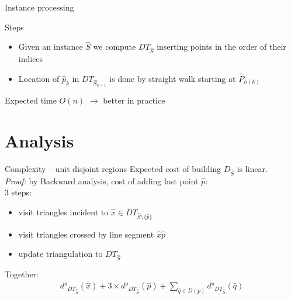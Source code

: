 \documentclass{beamer}
\begin{document}
\begin{frame}{Instance processing}
  \begin{block}{Steps}
    \begin{itemize}
     \item Given an instance $\hat{S}$ we compute $DT_{\hat{S}}$ inserting points in the order of their indices
     \item Location of $\hat{p}_k$ in $DT_{\hat{S}_{k-1}}$ is done by straight walk starting at $\hat{P}_{h(k)}$
    \end{itemize}
  \end{block}
  
  \begin{block}{Expected time}
    $O(n)$ $\rightarrow$ better in practice
  \end{block}
  
\end{frame}


\section{Analysis}
\frame{\tableofcontents[currentsection]}

\begin{frame}

\end{frame}

\begin{frame}{Complexity -- unit disjoint regions}
Expected cost of building $D_{\hat{S}}$ is linear.
\\
\textit{Proof:} by Backward analysis, cost of adding last point $\hat{p}$:\\
3 steps:
\begin{itemize}
\item visit triangles incident to $\hat{x} \in DT_{\hat{S} \setminus \{\hat{p}\}}$
\item visit triangles crossed by line segment $\hat{x}\hat{p}$
\item update triangulation to $DT_{\hat{S}}$
\end{itemize}

Together: 
\begin{gather*}
d°_{DT_{\hat{S}}}(\hat{x}) + 3 \times d°_{DT_{\hat{S}}}(\hat{p}) + \sum_{\hat{q} \in D(p)} d°_{DT_{\hat{S}}}(\hat{q})
\end{gather*}

\end{frame}
\end{document}
